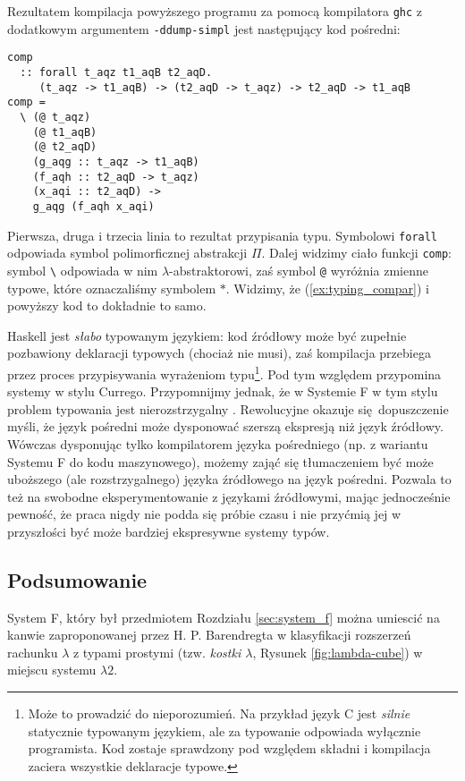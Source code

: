 Rezultatem kompilacja powyższego programu za pomocą kompilatora \texttt{ghc} z dodatkowym argumentem \texttt{-ddump-simpl} jest następujący kod pośredni:

\begin{verbatim}
comp
  :: forall t_aqz t1_aqB t2_aqD.
     (t_aqz -> t1_aqB) -> (t2_aqD -> t_aqz) -> t2_aqD -> t1_aqB
comp =
  \ (@ t_aqz)
    (@ t1_aqB)
    (@ t2_aqD)
    (g_aqg :: t_aqz -> t1_aqB)
    (f_aqh :: t2_aqD -> t_aqz)
    (x_aqi :: t2_aqD) ->
    g_aqg (f_aqh x_aqi)
\end{verbatim}

Pierwsza, druga i trzecia linia to rezultat przypisania typu. Symbolowi \texttt{forall} odpowiada symbol polimorficznej abstrakcji \(\Pi\). Dalej widzimy ciało funkcji \texttt{comp}: symbol \texttt{\textbackslash} odpowiada w nim \(\lambda\)-abstraktorowi, zaś symbol \texttt{@} wyróżnia zmienne typowe, które oznaczaliśmy symbolem \(\ast\). Widzimy, że (\ref{ex:typing_compar}) i powyższy kod to dokładnie to samo.

Haskell jest \emph{słabo} typowanym językiem: kod źródłowy może być zupełnie pozbawiony deklaracji typowych (chociaż nie musi), zaś kompilacja przebiega przez proces przypisywania wyrażeniom typu\footnote{Może to prowadzić do nieporozumień. Na przykład język C jest \emph{silnie} statycznie typowanym językiem, ale za typowanie odpowiada wyłącznie programista. Kod zostaje sprawdzony pod względem składni i kompilacja zaciera wszystkie deklaracje typowe.}. Pod tym względem przypomina systemy w stylu Currego. Przypomnijmy jednak, że w Systemie F w tym stylu problem typowania jest nierozstrzygalny \cite{Wells_98}. Rewolucyjne okazuje się dopuszczenie myśli, że język pośredni może dysponować szerszą ekspresją niż język źródłowy. Wówczas dysponując tylko kompilatorem języka pośredniego (np. z wariantu Systemu F do kodu maszynowego), możemy zająć się tłumaczeniem być może uboższego (ale rozstrzygalnego) języka źródłowego na język pośredni. Pozwala to też na swobodne eksperymentowanie z językami źródłowymi, mając jednocześnie pewność, że praca nigdy nie podda się próbie czasu i nie przyćmią jej w przyszłości być może bardziej ekspresywne systemy typów.

\newpage

\subsection{Podsumowanie}
System F, który był przedmiotem Rozdziału \ref{sec:system_f} można umiescić na kanwie zaproponowanej przez H. P. Barendregta w \cite[Rozdział 5]{Barendregt_1992} klasyfikacji rozszerzeń rachunku \(\lambda\) z typami prostymi (tzw. \emph{kostki \(\lambda\)}, Rysunek \ref{fig:lambda-cube}) w miejscu systemu \(\lambda 2\). 

